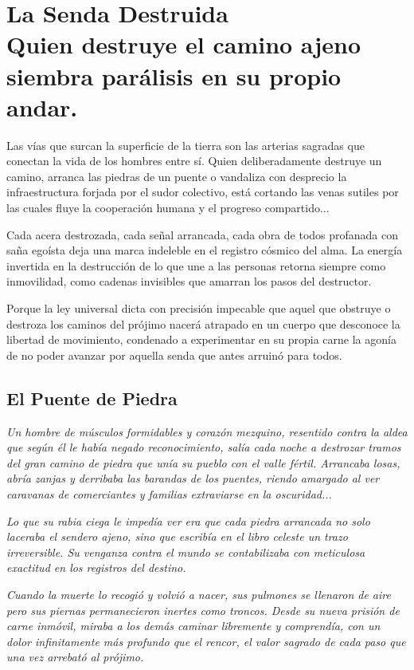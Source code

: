 \chapter[La Senda Destruida]{La Senda Destruida\\ \large Quien destruye el camino ajeno siembra parálisis en su propio andar.}


\lettrine[lines=3, nindent=0.5em, findent=0.2em]{L}{}as vías que surcan la superficie de la tierra son las arterias sagradas que conectan la vida de los hombres entre sí. Quien deliberadamente destruye un camino, arranca las piedras de un puente o vandaliza con desprecio la infraestructura forjada por el sudor colectivo, está cortando las venas sutiles por las cuales fluye la cooperación humana y el progreso compartido...

Cada acera destrozada, cada señal arrancada, cada obra de todos profanada con saña egoísta deja una marca indeleble en el registro cósmico del alma. La energía invertida en la destrucción de lo que une a las personas retorna siempre como inmovilidad, como cadenas invisibles que amarran los pasos del destructor.

Porque la ley universal dicta con precisión impecable que aquel que obstruye o destroza los caminos del prójimo nacerá atrapado en un cuerpo que desconoce la libertad de movimiento, condenado a experimentar en su propia carne la agonía de no poder avanzar por aquella senda que antes arruinó para todos.

\section{El Puente de Piedra}
\begin{elegantquote}
\textit{Un hombre de músculos formidables y corazón mezquino, resentido contra la aldea que según él le había negado reconocimiento, salía cada noche a destrozar tramos del gran camino de piedra que unía su pueblo con el valle fértil. Arrancaba losas, abría zanjas y derribaba las barandas de los puentes, riendo amargado al ver caravanas de comerciantes y familias extraviarse en la oscuridad...}

\textit{Lo que su rabia ciega le impedía ver era que cada piedra arrancada no solo laceraba el sendero ajeno, sino que escribía en el libro celeste un trazo irreversible. Su venganza contra el mundo se contabilizaba con meticulosa exactitud en los registros del destino.}

\textit{Cuando la muerte lo recogió y volvió a nacer, sus pulmones se llenaron de aire pero sus piernas permanecieron inertes como troncos. Desde su nueva prisión de carne inmóvil, miraba a los demás caminar libremente y comprendía, con un dolor infinitamente más profundo que el rencor, el valor sagrado de cada paso que una vez arrebató al prójimo.}

\end{elegantquote}

